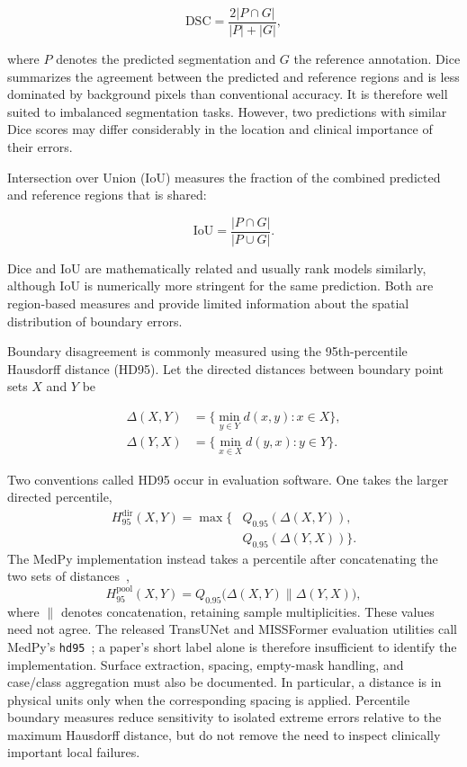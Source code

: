 \documentclass[5p,times,authoryear]{elsarticle}
\begin{document}
\[
\mathrm{DSC}
=
\frac{2|P \cap G|}{|P| + |G|},
\]

where $P$ denotes the predicted segmentation and $G$ the reference annotation. Dice summarizes the agreement between the predicted and reference regions and is less dominated by background pixels than conventional accuracy. It is therefore well suited to imbalanced segmentation tasks. However, two predictions with similar Dice scores may differ considerably in the location and clinical importance of their errors.

Intersection over Union (IoU) measures the fraction of the combined predicted and reference regions that is shared:

\[
\mathrm{IoU}
=
\frac{|P \cap G|}{|P \cup G|}.
\]

Dice and IoU are mathematically related and usually rank models similarly, although IoU is numerically more stringent for the same prediction. Both are region-based measures and provide limited information about the spatial distribution of boundary errors.

Boundary disagreement is commonly measured using the 95th-percentile Hausdorff distance (HD95). Let the directed distances between boundary point sets $X$ and $Y$ be

\[
\begin{aligned}
\Delta(X,Y)&=\{\min_{y\in Y}d(x,y):x\in X\},\\
\Delta(Y,X)&=\{\min_{x\in X}d(y,x):y\in Y\}.
\end{aligned}
\]

Two conventions called HD95 occur in evaluation software. One takes the larger directed percentile,
\[
\begin{aligned}
H_{95}^{\mathrm{dir}}(X,Y)=\max\{&Q_{0.95}(\Delta(X,Y)),\\
&Q_{0.95}(\Delta(Y,X))\}.
\end{aligned}
\]
The MedPy implementation instead takes a percentile after concatenating the two sets of distances~\citep{medpy_hd95_verified},
\[
H_{95}^{\mathrm{pool}}(X,Y)=Q_{0.95}\bigl(\Delta(X,Y)\mathbin{\|}\Delta(Y,X)\bigr),
\]
where $\|$ denotes concatenation, retaining sample multiplicities. These values need not agree. The released TransUNet and MISSFormer evaluation utilities call MedPy's \texttt{hd95}~\citep{transunet_code_verified,missformer_code_verified}; a paper's short label alone is therefore insufficient to identify the implementation. Surface extraction, spacing, empty-mask handling, and case/class aggregation must also be documented. In particular, a distance is in physical units only when the corresponding spacing is applied. Percentile boundary measures reduce sensitivity to isolated extreme errors relative to the maximum Hausdorff distance, but do not remove the need to inspect clinically important local failures.
\end{document}
